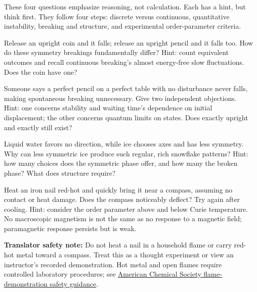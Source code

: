 \begin{mainline}
These four questions emphasize reasoning, not calculation. Each has a hint, but think first. They follow four steps: discrete versus continuous, quantitative instability, breaking and structure, and experimental order-parameter criteria.

\begin{puzzles}
  \item Release an upright coin and it falls; release an upright pencil and it falls too. How do these symmetry breakings fundamentally differ? Hint: count equivalent outcomes and recall continuous breaking's almost energy-free slow fluctuations. Does the coin have one?
  \item Someone says a perfect pencil on a perfect table with no disturbance never falls, making spontaneous breaking unnecessary. Give two independent objections. Hint: one concerns stability and waiting time's dependence on initial displacement; the other concerns quantum limits on states. Does exactly upright and exactly still exist?
  \item Liquid water favors no direction, while ice chooses axes and has less symmetry. Why can less symmetric ice produce such regular, rich snowflake patterns? Hint: how many choices does the symmetric phase offer, and how many the broken phase? What does structure require?
  \item Heat an iron nail red-hot and quickly bring it near a compass, assuming no contact or heat damage. Does the compass noticeably deflect? Try again after cooling. Hint: consider the order parameter above and below Curie temperature. No macroscopic magnetism is not the same as no response to a magnetic field; paramagnetic response persists but is weak.

\textbf{Translator safety note:} Do not heat a nail in a household flame or carry red-hot metal toward a compass. Treat this as a thought experiment or view an instructor's recorded demonstration. Hot metal and open flames require controlled laboratory procedures; see \href{https://institute.acs.org/acs-center/lab-safety/education-training/safer-experiments/flame-test.html}{American Chemical Society flame-demonstration safety guidance}.
\end{puzzles}
\end{mainline}
